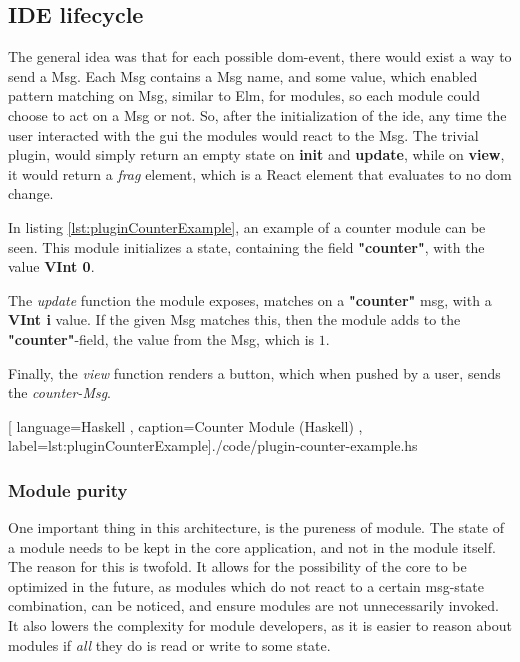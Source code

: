 \subsection{IDE lifecycle}

The general idea was that for each possible \gls*{dom}-event, there would exist a
way to send a Msg. Each Msg contains a Msg name, and some value, which enabled
pattern matching on Msg, similar to Elm, for modules, so each module could
choose to act on a Msg or not. So, after the initialization of the \gls*{ide},
any time the user interacted with the \gls*{gui} the modules would react to the
Msg. The trivial plugin, would simply return an empty state on \textbf{init} and
\textbf{update}, while on \textbf{view}, it would return a \textit{frag}
element, which is a React element that evaluates to no \gls*{dom} change.

In listing \ref{lst:pluginCounterExample}, an example of a counter module can be
seen. This module initializes a state, containing the field \textbf{"counter"},
with the value \textbf{VInt 0}.

The \textit{update} function the module exposes, matches on a \textbf{"counter"}
msg, with a \textbf{VInt i} value. If the given Msg matches this, then the
module adds to the \textbf{"counter"}-field, the value from the Msg, which is
$1$.

Finally, the \textit{view} function renders a button, which when pushed by a
user, sends the \textit{counter-Msg}.

\begin{center}
  
    [ language=Haskell
    , caption={Counter Module (Haskell)}
    , label=lst:pluginCounterExample]{./code/plugin-counter-example.hs}
\end{center}

\subsubsection{Module purity}

One important thing in this architecture, is the pureness of module. The state
of a module needs to be kept in the core application, and not in the module
itself. The reason for this is twofold. It allows for the possibility of the
core to be optimized in the future, as modules which do not react to a certain
msg-state combination, can be noticed, and ensure modules are not unnecessarily
invoked. It also lowers the complexity for module developers, as it is easier to
reason about modules if \textit{all} they do is read or write to some state.

